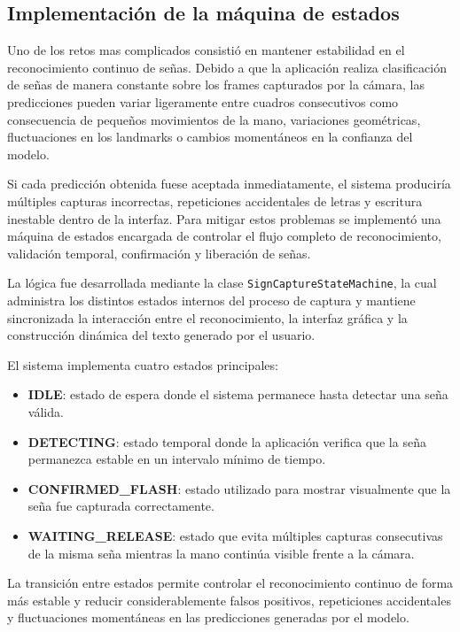 	
	\subsection{Implementación de la máquina de estados}
	
	Uno de los retos mas complicados consistió en mantener estabilidad en el reconocimiento continuo de señas. Debido a que la aplicación realiza clasificación de señas de manera constante sobre los frames capturados por la cámara, las predicciones pueden variar ligeramente entre cuadros consecutivos como consecuencia de pequeños movimientos de la mano, variaciones geométricas, fluctuaciones en los landmarks o cambios momentáneos en la confianza del modelo.
	
	Si cada predicción obtenida fuese aceptada inmediatamente, el sistema produciría múltiples capturas incorrectas, repeticiones accidentales de letras y escritura inestable dentro de la interfaz. Para mitigar estos problemas se implementó una máquina de estados encargada de controlar el flujo completo de reconocimiento, validación temporal, confirmación y liberación de señas.
	
	La lógica fue desarrollada mediante la clase \texttt{SignCaptureStateMachine}, la cual administra los distintos estados internos del proceso de captura y mantiene sincronizada la interacción entre el reconocimiento, la interfaz gráfica y la construcción dinámica del texto generado por el usuario.
	
	El sistema implementa cuatro estados principales:
	
	\begin{itemize}
		\item \textbf{IDLE}: estado de espera donde el sistema permanece hasta detectar una seña válida.
		
		\item \textbf{DETECTING}: estado temporal donde la aplicación verifica que la seña permanezca estable en un intervalo mínimo de tiempo.
		
		\item \textbf{CONFIRMED\_FLASH}: estado utilizado para mostrar visualmente que la seña fue capturada correctamente.
		
		\item \textbf{WAITING\_RELEASE}: estado que evita múltiples capturas consecutivas de la misma seña mientras la mano continúa visible frente a la cámara.
	\end{itemize}
	
	La transición entre estados permite controlar el reconocimiento continuo de forma más estable y reducir considerablemente falsos positivos, repeticiones accidentales y fluctuaciones momentáneas en las predicciones generadas por el modelo.
	
